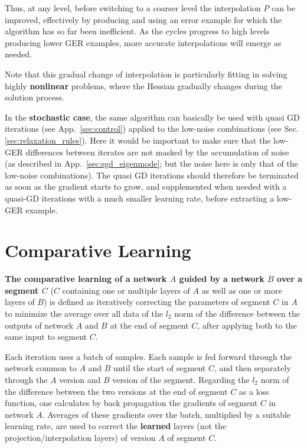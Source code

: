 \documentclass{article} %
\begin{document}
Thus, at any level, before switching to a coarser level the interpolation $P$ can be improved, effectively by producing and using an error example for which the algorithm has so far been inefficient. As the cycles progress to high levels producing lower GER examples, more accurate interpolations will emerge as needed.

Note that this gradual change of interpolation is particularly fitting in solving highly \textbf{nonlinear} problems, where the Hessian gradually changes during the solution process.

In the \textbf{stochastic case}, the same algorithm can basically be used with quasi GD iterations (see App.~\ref{sec:control}) applied to the low-noise combinations (see Sec.\ref{sec:relaxation_rules}). Here it would be important to make sure that the low-GER differences between iterates are not masked by the accumulation of noise (as described in App.~\ref{sec:sgd_eigenmode}; but the noise here is only that of the low-noise combinations). The quasi GD iterations should therefore be terminated as soon as the gradient starts to grow, and supplemented when needed with a quasi-GD iterations with a much smaller learning rate, before extracting a low-GER example.


\section{Comparative Learning}
\label{sec:tunning}
\textbf{The comparative learning of a network $A$ guided by a network $B$ over a segment $C$} ($C$ containing one or multiple layers of $A$ as well as one or more layers of $B$) is defined as iteratively correcting the parameters of segment $C$ in $A$ to minimize the average over all data of the $l_2$ norm of the difference between the outputs of network $A$ and $B$ at the end of segment $C$, after applying both to the same input to segment $C$.

Each iteration uses a batch of samples. Each sample is fed forward through the network common to $A$ and $B$ until the start of segment $C$, and then separately through the $A$ version and $B$ version of the segment. Regarding the $l_2$ norm of the difference between the two versions at the end of segment $C$ as a loss function, one calculates by back propagation the gradients of segment $C$ in network $A$. Averages of these gradients over the batch, multiplied by a suitable learning rate, are used to correct the \textbf{learned} layers (not the projection/interpolation layers) of version $A$ of segment $C$.
\end{document}
